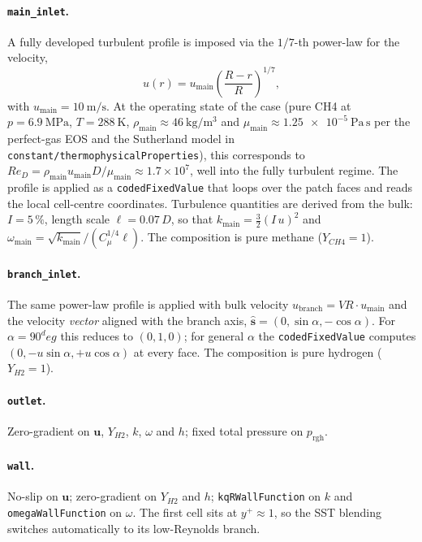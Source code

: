 \documentclass[11pt,a4paper]{article}
\def\Hi{H2}%
\def\CHi{CH4}%
\def\VR{VR}%
\def\circ{ deg}%
\newcommand{\Hi}{\ensuremath{\mathrm{H_2}}}
\newcommand{\CHi}{\ensuremath{\mathrm{CH_4}}}
\newcommand{\VR}{\ensuremath{\mathrm{VR}}}
\begin{document}
\paragraph{\texttt{main\_inlet}.}\;
A fully developed turbulent profile is imposed via the \(1/7\)-th
power-law for the velocity,
\begin{equation}
u(r) = u_{\mathrm{main}}\left(\frac{R-r}{R}\right)^{1/7},
\label{eq:powerlaw}
\end{equation}
with \(u_{\mathrm{main}} = \SI{10}{\meter\per\second}\). At the
operating state of the case (pure \CHi{} at \(p=\SI{6.9}{\mega\pascal}\),
\(T=\SI{288}{\kelvin}\), \(\rho_{\mathrm{main}}\approx
\SI{46}{\kilogram\per\meter\cubed}\) and
\(\mu_{\mathrm{main}}\approx \SI{1.25e-5}{\pascal\,\second}\) per
the perfect-gas EOS and the Sutherland model in
\texttt{constant/thermophysicalProperties}), this corresponds to
\(Re_D = \rho_{\mathrm{main}} u_{\mathrm{main}}
D/\mu_{\mathrm{main}} \approx 1.7\times 10^{7}\), well into the
fully turbulent regime. The
profile is applied as a \texttt{codedFixedValue} that loops over
the patch faces and reads the local cell-centre coordinates.
Turbulence quantities are derived from the bulk: \(I = 5\,\%\),
length scale \(\ell = 0.07\,D\), so that
\(k_{\mathrm{main}}=\tfrac{3}{2}(I\,u)^2\) and
\(\omega_{\mathrm{main}}=\sqrt{k_{\mathrm{main}}}/(C_\mu^{1/4}\ell)\).
The composition is pure methane (\(Y_{\CHi}=1\)).

\paragraph{\texttt{branch\_inlet}.}\;
The same power-law profile is applied with bulk velocity
\(u_{\mathrm{branch}}=\VR\cdot u_{\mathrm{main}}\) and the velocity
\emph{vector} aligned with the branch axis,
\(\hat{\mathbf{s}} = (0,\sin\alpha,-\cos\alpha)\). For
\(\alpha=90^\circ\) this reduces to \((0,1,0)\); for general
\(\alpha\) the \texttt{codedFixedValue} computes
\((0,-u\sin\alpha,+u\cos\alpha)\) at every face. The composition is
pure hydrogen (\(Y_{\Hi}=1\)).

\paragraph{\texttt{outlet}.}\;
Zero-gradient on \(\mathbf{u}\), \(Y_{\Hi}\), \(k\), \(\omega\)
and \(h\); fixed total pressure on \(p_{\mathrm{rgh}}\).

\paragraph{\texttt{wall}.}\;
No-slip on \(\mathbf{u}\); zero-gradient on \(Y_{\Hi}\) and \(h\);
\texttt{kqRWallFunction} on \(k\) and \texttt{omegaWallFunction} on
\(\omega\). The first cell sits at \(y^+\approx 1\), so the SST
blending switches automatically to its low-Reynolds branch.
\end{document}
